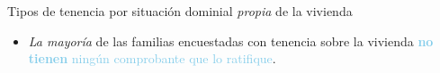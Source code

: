 \documentclass[aspectratio=169]{beamer}
\begin{document}
    \begin{frame}{Tipos de tenencia por situación dominial \textit{propia} de la vivienda}
        \begin{minipage}{.65\linewidth}
            \begin{overlayarea}{\linewidth}{.75\textheight}
            \end{overlayarea}
        \end{minipage}
        \begin{minipage}{.34\linewidth}
            \setlength{\leftmargini}{12pt}
            \begin{itemize}
                \item<2-> \textit{La mayoría} de las familias encuestadas con tenencia sobre la vivienda \textcolor{skyblue}{\textbf{no tienen} ningún comprobante que lo ratifique}.
            \end{itemize}
        \end{minipage}
    \end{frame}
\end{document}
